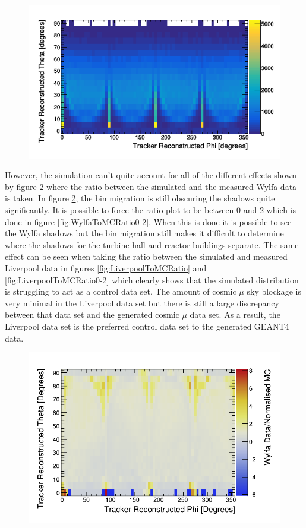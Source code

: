 \begin{figure}[htbp]
 \centering
 \includegraphics[width=0.7\linewidth]{Chapter5/Figs/UsingSimulatedDataAsControl/mc_PvsT.png}
 \label{fig:mc_PvsT}
\end{figure}

However, the simulation can't quite account for all of the different effects shown by figure \ref{fig:WylfaToMCRatio} where the ratio between the simulated and the measured Wylfa data is taken. In figure \ref{fig:WylfaToMCRatio}, the bin migration is still obscuring the shadows quite significantly. It is possible to force the ratio plot to be between 0 and 2 which is done in figure \ref{fig:WylfaToMCRatio0-2}. When this is done it is possible to see the Wylfa shadows but the bin migration still makes it difficult to determine where the shadows for the turbine hall and reactor buildings separate. The same effect can be seen when taking the ratio between the simulated and measured Liverpool data in figures \ref{fig:LiverpoolToMCRatio} and \ref{fig:LiverpoolToMCRatio0-2} which clearly shows that the simulated distribution is struggling to act as a control data set. The amount of cosmic $\mu$ sky blockage is very minimal in the Liverpool data set but there is still a large discrepancy between that data set and the generated cosmic $\mu$ data set. As a result, the Liverpool data set is the preferred control data set to the generated GEANT4 data. 

\begin{figure}[htbp]
 \centering
 \includegraphics[width=0.7\linewidth]{Chapter5/Figs/UsingSimulatedDataAsControl/WylfaToMCRatio.png}
 \label{fig:WylfaToMCRatio}
\end{figure}

